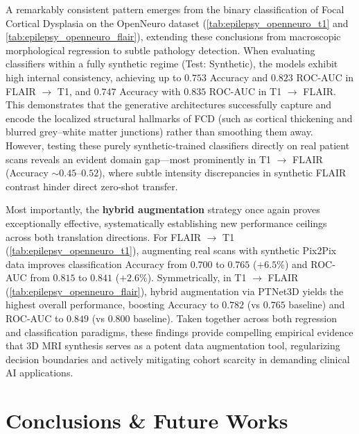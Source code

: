 \documentclass[11pt,a4paper]{article}
\begin{document}
A remarkably consistent pattern emerges from the binary classification of Focal Cortical Dysplasia on the OpenNeuro dataset (\autoref{tab:epilepsy_openneuro_t1} and \autoref{tab:epilepsy_openneuro_flair}), extending these conclusions from macroscopic morphological regression to subtle pathology detection. When evaluating classifiers within a fully synthetic regime (Test: Synthetic), the models exhibit high internal consistency, achieving up to $0.753$ Accuracy and $0.823$ ROC-AUC in FLAIR $\rightarrow$ T1, and $0.747$ Accuracy with $0.835$ ROC-AUC in T1 $\rightarrow$ FLAIR. This demonstrates that the generative architectures successfully capture and encode the localized structural hallmarks of FCD (such as cortical thickening and blurred grey--white matter junctions) rather than smoothing them away. However, testing these purely synthetic-trained classifiers directly on real patient scans reveals an evident domain gap---most prominently in T1 $\rightarrow$ FLAIR (Accuracy $\sim 0.45$--$0.52$), where subtle intensity discrepancies in synthetic FLAIR contrast hinder direct zero-shot transfer.

Most importantly, the \textbf{hybrid augmentation} strategy once again proves exceptionally effective, systematically establishing new performance ceilings across both translation directions. For FLAIR $\rightarrow$ T1 (\autoref{tab:epilepsy_openneuro_t1}), augmenting real scans with synthetic Pix2Pix data improves classification Accuracy from $0.700$ to $\mathbf{0.765}$ ($+6.5\%$) and ROC-AUC from $0.815$ to $\mathbf{0.841}$ ($+2.6\%$). Symmetrically, in T1 $\rightarrow$ FLAIR (\autoref{tab:epilepsy_openneuro_flair}), hybrid augmentation via PTNet3D yields the highest overall performance, boosting Accuracy to $\mathbf{0.782}$ (vs $0.765$ baseline) and ROC-AUC to $\mathbf{0.849}$ (vs $0.800$ baseline). Taken together across both regression and classification paradigms, these findings provide compelling empirical evidence that 3D MRI synthesis serves as a potent data augmentation tool, regularizing decision boundaries and actively mitigating cohort scarcity in demanding clinical AI applications.


\section{Conclusions \& Future Works}
\label{sec: 7}
\end{document}
